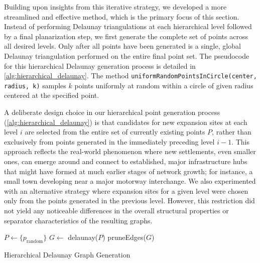 Building upon insights from this iterative strategy, we developed a more streamlined and effective method, which is the primary focus of this section.
Instead of performing Delaunay triangulations at each hierarchical level followed by a final planarization step, we first generate the complete set of points across all desired levels.
Only after all points have been generated is a single, global Delaunay triangulation performed on the entire final point set.
The pseudocode for this hierarchical Delaunay generation process is detailed in \cref{alg:hierarchical_delaunay}.
The method \texttt{uniformRandomPointsInCircle(center, radius, k)} samples \(k\) points uniformly at random within a circle of given radius centered at the specified point.

A deliberate design choice in our hierarchical point generation process (\cref{alg:hierarchical_delaunay}) is that candidates for new expansion sites at each level \(i\) are selected from the entire set of currently existing points \(P\), rather than exclusively from points generated in the immediately preceding level \(i-1\).
This approach reflects the real-world phenomenon where new settlements, even smaller ones, can emerge around and connect to established, major infrastructure hubs that might have formed at much earlier stages of network growth; for instance, a small town developing near a major motorway interchange.
We also experimented with an alternative strategy where expansion sites for a given level were chosen only from the points generated in the previous level.
However, this restriction did not yield any noticeable differences in the overall structural properties or separator characteristics of the resulting graphs.

\begin{algorithm}[tbhp]
	\BlankLine
	\(P \longleftarrow \{p_\text{random}\}\)\;
	\BlankLine
	\BlankLine
	\(G \longleftarrow\) delaunay(\(P\))\;
	pruneEdges(\(G\))\;
	\;
	\caption{Hierarchical Delaunay Graph Generation}
	\label{alg:hierarchical_delaunay}
\end{algorithm}

